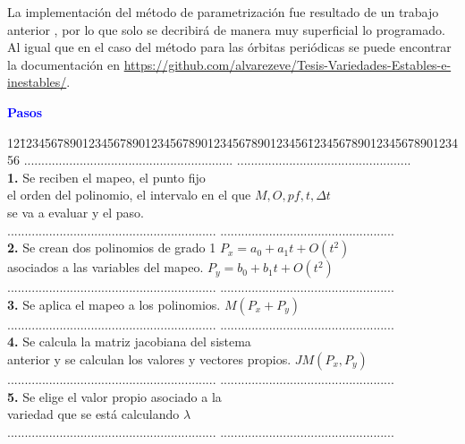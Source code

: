La implementaci\'on del m\'etodo de parametrizaci\'on fue resultado de un trabajo anterior \cite{eve}, por lo que solo se decribir\'a de manera muy superficial lo programado. Al igual que en el caso del m\'etodo para las \'orbitas peri\'odicas se puede encontrar la documentaci\'on en \url{https://github.com/alvarezeve/Tesis-Variedades-Estables-e-inestables/}. 

\begin{center}
	\textcolor{blue}{\textbf{Pasos}}
	\begin{tabbing}
		12\=1234567890123456789012345678901234567890123456\=12345678901234567890123456\kill%
		\>............................................................  \>..................................................\\
		\>\textbf{1.} Se reciben el mapeo, el punto fijo  \> \\
		\> el orden del polinomio, el intervalo en el que \> $M, O, pf, t, \Delta t$\\
		\> se va a evaluar y el paso.\> \\
		\>............................................................  \>..................................................\\
		\>\textbf{2.} Se crean dos polinomios de grado 1  \> $P_{x} = a_{0}+a_{1}t+O(t^{2})$\\
		\> asociados a las variables del mapeo. \>  $P_{y} = b_{0} +b_{1}t+O(t^{2})$ \\
		\>............................................................  \>..................................................\\
		\>\textbf{3.} Se aplica el mapeo a los polinomios.  \> $M(P_{x}+P_{y})$\\
		\>............................................................  \>..................................................\\
		\>\textbf{4.} Se calcula la matriz jacobiana del sistema \> \\
		\>anterior y se calculan los valores y vectores propios.\> $JM(P_{x},P_{y})$\\
		\>............................................................  \>..................................................\\
		\>\textbf{5.} Se elige el valor propio asociado a la  \> \\
		\>variedad que se está calculando \> $\lambda$\\
		\>............................................................  \>..................................................\\

\end{tabbing}
\end{center}
